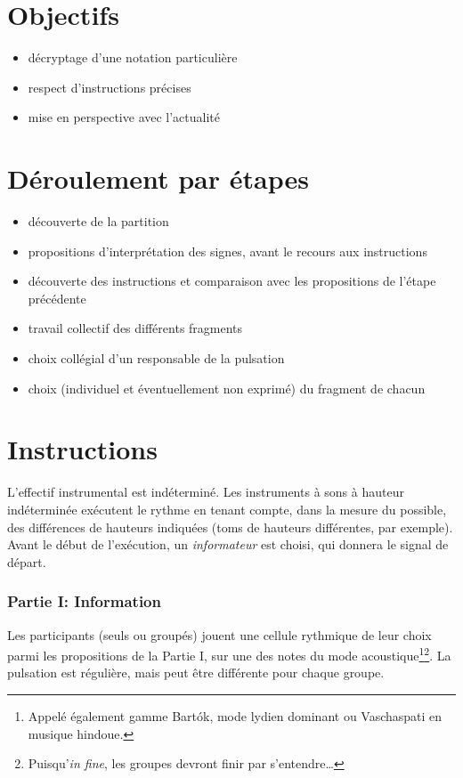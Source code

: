 \documentclass[a4paper,11pt,bibliography=totoc,numbers=noenddot,listof=flat,DIV=11,BCOR=0mm]{scrreprt}%
\begin{document}
\section*{Objectifs}
\begin{itemize}
\item décryptage d'une notation particulière
\item respect d'instructions précises
\item mise en perspective avec l'actualité
\end{itemize}


\section*{Déroulement par étapes}
\begin{itemize}
\item découverte de la partition
\item propositions d'interprétation des signes, avant le recours aux instructions
\item découverte des instructions et comparaison avec les propositions de l'étape précédente
\item travail collectif des différents fragments
\item choix collégial d'un responsable de la pulsation
\item choix (individuel et éventuellement non exprimé) du fragment de chacun
\end{itemize}


\newpage	
\section*{Instructions}
L'effectif instrumental est indéterminé. Les instruments à sons à hauteur indéterminée exécutent le rythme en tenant compte, dans la mesure du possible, des différences de hauteurs indiquées (toms de hauteurs différentes, par exemple). Avant le début de l'exécution, un \emph{informateur} est choisi, qui donnera le signal de départ.

\subsubsection*{Partie I: \og Information \fg{}}
Les participants (seuls ou groupés) jouent une cellule rythmique de leur choix parmi les propositions de la Partie I, sur une des notes du mode acoustique\footnote{Appelé également gamme Bartók, mode lydien dominant ou Vaschaspati en musique hindoue.}\footnote{Puisqu'\emph{in fine}, les groupes devront finir par s'entendre\ldots{}}. La pulsation est régulière, mais peut être différente pour chaque groupe. 
\end{document}
